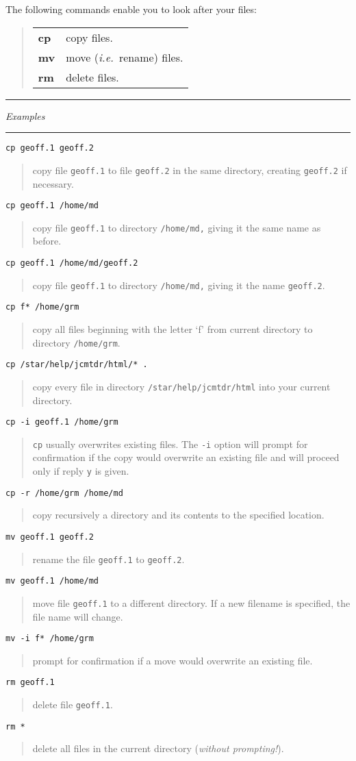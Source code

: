 \documentclass[twoside,11pt,nolof]{starlink}
\providecommand{\example}[2]{\goodbreak
                         \texttt{#1}
                         \vspace*{-4mm}
                         \begin{quote}
                           {\small #2}
                         \end{quote}
                        }
\providecommand{\exbegin}{\begin{center}
                      \rule{18mm}{0.3mm}
                      \emph{Examples}
                      \rule{18mm}{0.3mm}
                      \end{center}
                     }
\begin{document}
The following commands enable you to look after your files:

\begin{quote}
\begin{tabular}{lp{67mm}}

\textbf{cp}  & copy files.\\
\textbf{mv}  & move (\emph{i.e.}\ rename) files.\\
\textbf{rm}  & delete files.

\end{tabular}
\end{quote}

\exbegin

\example{cp geoff.1 geoff.2}
{copy file \texttt{geoff.1} to file \texttt{geoff.2} in the same directory, creating
\texttt{geoff.2} if necessary.}

\example{cp geoff.1 /home/md}
{copy file \texttt{geoff.1} to directory \texttt{/home/md,} giving it the same name
as before.}

\example{cp geoff.1 /home/md/geoff.2}
{copy file \texttt{geoff.1} to directory \texttt{/home/md,} giving it the name
\texttt{geoff.2}.}

\example{cp f* /home/grm}
{copy all files beginning with the letter `f' from current directory to
directory \texttt{/home/grm}.}

\example{cp /star/help/jcmtdr/html/* .}
{copy every file in directory \texttt{/star/help/jcmtdr/html} into your current
directory.}

\example{cp -i geoff.1 /home/grm}
{\texttt{cp} usually overwrites existing files. The \texttt{-i} option will prompt
for confirmation if the copy would overwrite an existing file and will proceed
only if reply \texttt{y} is given.}

\example{cp -r /home/grm /home/md}
{copy recursively a directory and its contents to the specified location.}

\example{mv geoff.1 geoff.2}
{rename the file \texttt{geoff.1} to \texttt{geoff.2}.}

\example{mv geoff.1 /home/md}
{move file \texttt{geoff.1} to a different directory.
If a new filename is specified, the file name will change.}

\example{mv -i f* /home/grm}
{prompt for confirmation if a move would overwrite an existing file.}

\example{rm geoff.1}
{delete file \texttt{geoff.1}.}

\example{rm *}
{delete all files in the current directory (\textit{without prompting!}).}
\end{document}
